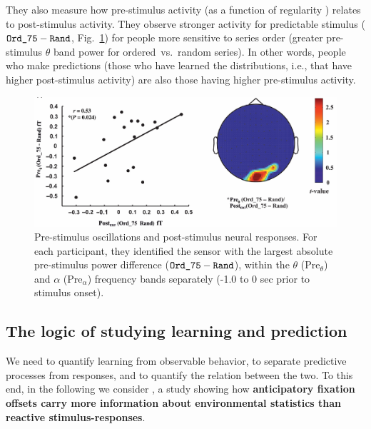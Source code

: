They also measure how pre-stimulus activity (as a function of regularity \notet) relates to post-stimulus activity. They observe  stronger activity for predictable stimulus ($\text{\texttt{Ord\_75}}-\text{\texttt{Rand}}$, Fig.~\ref{fig:cashdollar_2}) for people more sensitive to series order (greater pre-stimulus $\theta$ band power for ordered~vs.~random series). In other words, people who make predictions (those who have learned the distributions, i.e., that have higher post-stimulus activity) are also those having higher pre-stimulus activity.


\begin{figure}[!ht]
    \centering
    \captionsetup{width=.8\linewidth}
    \includegraphics[width=0.7\linewidth]{images/cashdollar_2.png}
    \caption{Pre-stimulus oscillations and post-stimulus neural responses. For each participant, they identified the sensor with the largest absolute pre-stimulus power difference ($\text{\texttt{Ord\_75}}-\text{\texttt{Rand}}$), within the $\theta$ (Pre$_\theta$) and $\alpha$ (Pre$_\alpha$) frequency bands separately (-1.0 to 0 sec prior to stimulus onset).}
    \label{fig:cashdollar_2}
\end{figure}

\subsection{The logic of studying learning and prediction}
We need to quantify learning from observable behavior, to separate predictive processes from responses, and to quantify the relation between the two. To this end, in the following we consider \cite{notaro}, a study showing how \textbf{anticipatory fixation offsets carry more information about environmental statistics than reactive stimulus-responses}.

